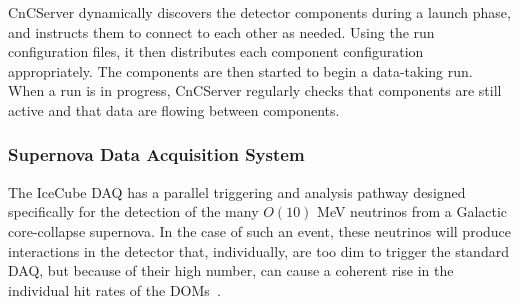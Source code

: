 CnCServer dynamically discovers the detector components during a launch
phase, and instructs them to connect to each other as needed.  Using the
run configuration files, it then distributes each component configuration
appropriately.  The components are then started to begin a data-taking run.
When a run is in progress, CnCServer regularly checks that components are
still active and that data are flowing between components.




\subsubsection{\label{sect:SNDAQ}Supernova Data Acquisition System}

The IceCube DAQ has a parallel triggering and analysis pathway designed
specifically for the detection of the many $O(10)$ MeV neutrinos from a
Galactic core-collapse supernova.  In the case of such an event, these
neutrinos will produce interactions in
the detector that, individually, are too dim to trigger the standard DAQ,
but because of their high number, can cause a coherent rise in the
individual hit rates of the DOMs~\cite{IC3:supernova}.

